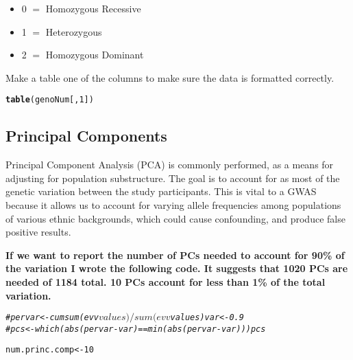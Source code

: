 \documentclass[11pt]{article}\usepackage[]{graphicx}\usepackage[]{color}
\makeatletter
\newcommand{\hlnum}[1]{\textcolor[rgb]{0.686,0.059,0.569}{#1}}%
\newcommand{\hlcom}[1]{\textcolor[rgb]{0.678,0.584,0.686}{\textit{#1}}}%
\newcommand{\hlstd}[1]{\textcolor[rgb]{0.345,0.345,0.345}{#1}}%
\newcommand{\hlkwb}[1]{\textcolor[rgb]{0.69,0.353,0.396}{#1}}%
\newcommand{\hlkwd}[1]{\textcolor[rgb]{0.737,0.353,0.396}{\textbf{#1}}}%
\newenvironment{kframe}{%
 \def\at@end@of@kframe{}%
 \ifinner\ifhmode%
  \def\at@end@of@kframe{\end{minipage}}%
  \begin{minipage}{\columnwidth}%
 \fi\fi%
 \def\FrameCommand##1{\hskip\@totalleftmargin \hskip-\fboxsep
 \colorbox{shadecolor}{##1}\hskip-\fboxsep
     \hskip-\linewidth \hskip-\@totalleftmargin \hskip\columnwidth}%
 \MakeFramed {\advance\hsize-\width
   \@totalleftmargin\z@ \linewidth\hsize
   \@setminipage}}%
 {\par\unskip\endMakeFramed%
 \at@end@of@kframe}
\newenvironment{knitrout}{}{} %
\makeatother
\begin{document}
\begin{itemize}
  \item 0 $=$ Homozygous Recessive
  \item 1 $=$ Heterozygous
  \item 2 $=$ Homozygous Dominant
\end{itemize}

Make a table one of the columns to make sure the data is formatted correctly.
\begin{knitrout}
\color{fgcolor}\begin{kframe}
\begin{alltt}
\hlkwd{table}\hlstd{(genoNum[,} \hlnum{1}\hlstd{])}
\end{alltt}
\end{kframe}
\end{knitrout}

\subsection{Principal Components}
Principal Component Analysis (PCA) is commonly performed, as a means for adjusting for population substructure.  The goal is to account for as most of the genetic variation between the study participants.  This is vital to a GWAS because it allows us to account for varying allele frequencies among populations of various ethnic backgrounds, which could cause confounding, and produce false positive results.

\textbf{If we want to report the number of PCs needed to account for 90\% of the variation I wrote the following code.  It suggests that 1020 PCs are needed of 1184 total.  10 PCs account for less than 1\% of the total variation.}
\begin{knitrout}
\color{fgcolor}\begin{kframe}
\begin{alltt}
\hlcom{# pervar<-cumsum(evv$values)/sum(evv$values) var<-0.9}
\hlcom{# pcs<-which(abs(pervar-var)==min(abs(pervar-var))) pcs}
\end{alltt}
\end{kframe}
\end{knitrout}


\begin{knitrout}
\color{fgcolor}\begin{kframe}
\begin{alltt}
\hlstd{num.princ.comp} \hlkwb{<-} \hlnum{10}
\end{alltt}
\end{kframe}
\end{knitrout}
\end{document}
